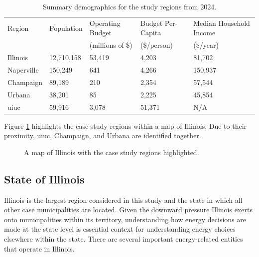 \begin{table}[htbp!]
    \centering
    \caption{Summary demographics for the study regions from 2024.}
    \label{tab:demographics}
    \begin{tabular}{lllll}
        \toprule
        Region & Population & Operating Budget & Budget Per-Capita & Median
        Household Income \\
        & & (millions of \$) & (\$/person) &(\$/year) \\
        \midrule
        Illinois
        \cite{united_states_census_bureau_quickfacts_2024-3,sturm_illinois_2024}&
        12,710,158  & 53,419 & 4,203 & 81,702\\
        Naperville
        \cite{united_states_census_bureau_quickfacts_2024-2,munch_annual_2024} &
        150,249  & 641 & 4,266 & 150,937 \\
        Champaign
        \cite{united_states_census_bureau_quickfacts_2024,nees_adopted_2024} &
        89,189 & 210 & 2,354 & 57,544 \\
        Urbana \cite{united_states_census_bureau_quickfacts_2024-1,
        ho_city_2024}& 38,201 & 85 & 2,225 & 45,854 \\
        \ac{uiuc} \cite{data_usa_university_2022,
        university_of_illinois_system_fy_2024} & 59,916 & 3,078 & 51,371 & N/A
        \\
        \bottomrule
    \end{tabular}
\end{table}

Figure \ref{fig:illinois-plot} highlights the case study regions within a map of
Illinois. Due to their proximity, \ac{uiuc}, Champaign, and Urbana are
identified together.

\begin{figure}[ht!]
    \centering
    \resizebox{0.4\columnwidth}{!}{}
    \caption{A map of Illinois with the case study regions highlighted.}
    \label{fig:illinois-plot}
\end{figure}

\subsection{State of Illinois}
Illinois is the largest region considered in this study and the state in which
all other case municipalities are located. Given the downward pressure Illinois
exerts onto municipalities within its territory, understanding how energy
decisions are made at the state level is essential context for understanding
energy choices elsewhere within the state. There are several important
energy-related entities that operate in Illinois.

